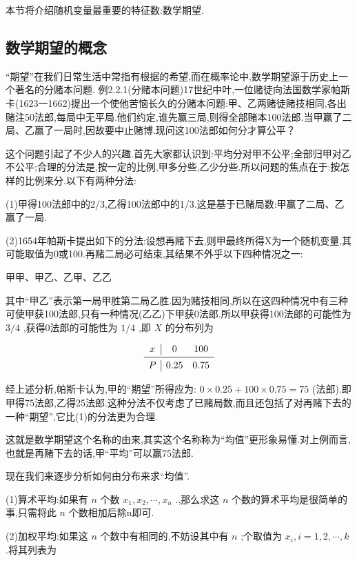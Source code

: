 本节将介绍随机变量最重要的特征数:数学期望.

\subsection{数学期望的概念}

“期望”在我们日常生活中常指有根据的希望,而在概率论中,数学期望源于历史上一个著名的分赌本问题.
例2.2.1(分赌本问题)17世纪中叶,一位赌徒向法国数学家帕斯卡(1623一1662)提出一个使他苦恼长久的分赌本问题:甲、乙两赌徒赌技相同,各出赌注50法郎,每局中无平局.他们约定,谁先赢三局,则得全部赌本100法郎.当甲赢了二局、乙赢了一局时,因故要中止赌博.现问这100法郎如何分才算公平？

这个问题引起了不少人的兴趣.首先大家都认识到:平均分对甲不公平;全部归甲对乙不公平;合理的分法是,按一定的比例,甲多分些,乙少分些.所以问题的焦点在于:按怎样的比例来分.以下有两种分法:

(1)甲得100法郎中的2/3,乙得100法郎中的1/3.这是基于已赌局数:甲赢了二局、乙赢了一局.

(2)1654年帕斯卡提出如下的分法:设想再赌下去,则甲最终所得X为一个随机变量,其可能取值为0或100.再赌二局必可结束,其结果不外乎以下四种情况之一:

\begin{center}
	甲甲、甲乙、乙甲、乙乙
\end{center}

其中“甲乙”表示第一局甲胜第二局乙胜.因为赌技相同,所以在这四种情况中有三种可使甲获100法郎,只有一种情况(乙乙)下甲获0法郎.所以甲获得100法郎的可能性为 $ 3/4 $ ,获得0法郎的可能性为 $ 1/4 $ ,即 $ X $ 的分布列为

\[ 
\begin{array}{c|cc}{x} & {0} & {100} \\ \midrule
P & {0.25} & {0.75} \\
\end{array}
\]

经上述分析,帕斯卡认为,甲的“期望”所得应为: $ 0 \times 0.25+100 \times 0.75=75 $ 
(法郎).即甲得75法郎,乙得25法郎.这种分法不仅考虑了已赌局数,而且还包括了对再赌下去的一种“期望”,它比(1)的分法更为合理.

这就是数学期望这个名称的由来,其实这个名称称为“均值”更形象易懂.对上例而言,也就是再赌下去的话,甲“平均”可以赢75法郎.

现在我们来逐步分析如何由分布来求“均值”.

(1)算术平均:如果有 $ n $ 个数 $ x_{1}, x_{2}, \cdots, x_{n} $ .,那么求这 $ n $ 个数的算术平均是很简单的事,只需将此 $ n $ 个数相加后除n即可.

(2)加权平均:如果这 $ n $ 个数中有相同的,不妨设其中有 $ n $ ;个取值为 $ x_{i}, i=1,2, \cdots, k $ .将其列表为

